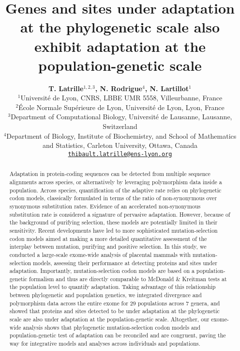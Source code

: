 \documentclass{article}
\title{Genes and sites under adaptation at the phylogenetic scale also exhibit adaptation at the population-genetic scale}
\author{
    \large
    \textbf{T. {Latrille}$^{1,2,3}$, N. {Rodrigue}$^{4}$, N. {Lartillot}$^{1}$}\\
    \normalsize
    $^{1}$Université de Lyon, CNRS, LBBE UMR 5558, Villeurbanne, France\\
    $^{2}$École Normale Supérieure de Lyon, Université de Lyon, Lyon, France\\
    $^{3}$Department of Computational Biology, Université de Lausanne, Lausanne, Switzerland\\
    $^{4}$Department of Biology, Institute of Biochemistry, and School of Mathematics and Statistics, Carleton University, Ottawa, Canada \\
    \texttt{\href{mailto:thibault.latrille@ens-lyon.org}{thibault.latrille@ens-lyon.org}} \\
}
\begin{document}
    \maketitle

    \begin{abstract}
        Adaptation in protein-coding sequences can be detected from multiple sequence alignments across species, or alternatively by leveraging polymorphism data inside a population.
        Across species, quantification of the adaptive rate relies on phylogenetic codon models, classically formulated in terms of the ratio of non-synonymous over synonymous substitution rates.
        Evidence of an accelerated non-synonymous substitution rate is considered a signature of pervasive adaptation.
        However, because of the background of purifying selection, these models are potentially limited in their sensitivity.
        Recent developments have led to more sophisticated mutation-selection codon models aimed at making a more detailed quantitative assessment of the interplay between mutation, purifying and positive selection.
        In this study, we conducted a large-scale exome-wide analysis of placental mammals with mutation-selection models, assessing their performance at detecting proteins and sites under adaptation.
        Importantly, mutation-selection codon models are based on a population-genetic formalism and thus are directly comparable to McDonald \& Kreitman tests at the population level to quantify adaptation.
        Taking advantage of this relationship between phylogenetic and population genetics, we integrated divergence and polymorphism data across the entire exome for 29 populations across 7 genera, and showed that proteins and sites detected to be under adaptation at the phylogenetic scale are also under adaptation at the population-genetic scale.
        Altogether, our exome-wide analysis shows that phylogenetic mutation-selection codon models and population-genetic test of adaptation can be reconciled and are congruent, paving the way for integrative models and analyses across individuals and populations.
    \end{abstract}

\end{document}
